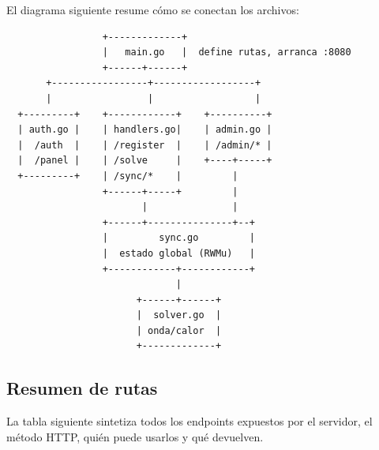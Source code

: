 \documentclass[12pt, a4paper]{article}
\begin{document}
El diagrama siguiente resume cómo se conectan los archivos:

\begin{verbatim}
                 +-------------+
                 |   main.go   |  define rutas, arranca :8080
                 +------+------+
       +-----------------+------------------+
       |                 |                  |
  +---------+    +------------+    +----------+
  | auth.go |    | handlers.go|    | admin.go |
  |  /auth  |    | /register  |    | /admin/* |
  |  /panel |    | /solve     |    +----+-----+
  +---------+    | /sync/*    |         |
                 +------+-----+         |
                        |               |
                 +------+---------------+--+
                 |         sync.go         |
                 |  estado global (RWMu)   |
                 +------------+------------+
                              |
                       +------+------+
                       |  solver.go  |
                       | onda/calor  |
                       +-------------+
\end{verbatim}

\subsection{Resumen de rutas}

La tabla siguiente sintetiza todos los endpoints expuestos por el servidor, el método
HTTP, quién puede usarlos y qué devuelven.
\end{document}
